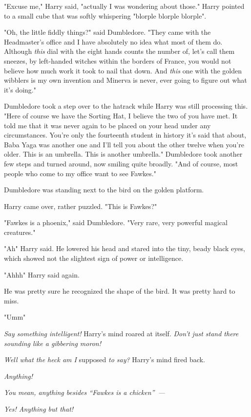 "Excuse me," Harry said, "actually I was wondering about those." Harry pointed
to a small cube that was softly whispering "blorple{\el} blorple{\el}
blorple".

"Oh, the little fiddly things?" said Dumbledore. "They came with the
Headmaster's office and I have absolutely no idea what most of them do.
Although \emph{this} dial with the eight hands counts the number of, let's call
them sneezes, by left-handed witches within the borders of France, you would
not believe how much work it took to nail that down. And \emph{this} one with
the golden wibblers is my own invention and Minerva is never, ever going to
figure out what it's doing."

Dumbledore took a step over to the hatrack while Harry was still processing
this. "Here of course we have the Sorting Hat, I believe the two of you have
met. It told me that it was never again to be placed on your head under any
circumstances. You're only the fourteenth student in history it's said that
about, Baba Yaga was another one and I'll tell you about the other twelve when
you're older. This is an umbrella. This is another umbrella." Dumbledore took
another few steps and turned around, now smiling quite broadly. "And of course,
most people who come to my office want to see Fawkes."

Dumbledore was standing next to the bird on the golden platform.

Harry came over, rather puzzled. "This is Fawkes?"

"Fawkes is a phoenix," said Dumbledore. "Very rare, very powerful magical
creatures."

"Ah{\el}" Harry said. He lowered his head and stared into the tiny, beady
black eyes, which showed not the slightest sign of power or intelligence.

"Ahhh{\el}" Harry said again.

He was pretty sure he recognized the shape of the bird. It was pretty hard to
miss.

"Umm{\el}"

\emph{Say something intelligent!} Harry's mind roared at itself. \emph{Don't
just stand there sounding like a gibbering moron!}

\emph{Well what the heck am I} supposed \emph{to say?} Harry's mind fired back.

\emph{Anything!}

\emph{You mean, anything besides ``Fawkes is a chicken''~--- }

\emph{Yes! Anything but that!}

